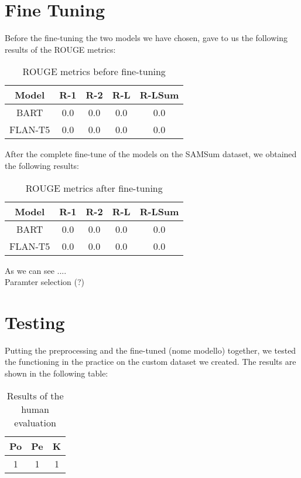 \documentclass[10pt,twocolumn,letterpaper]{article}
\begin{document}
\section{Fine Tuning}
Before the fine-tuning the two models we have chosen, gave to us the following results of the ROUGE metrics:
\begin{table}[h!]
    \centering
    \begin{tabular}{|c|c|c|c|c|}
        \hline
        Model & R-1 & R-2 & R-L & R-LSum \\ 
        \hline
        BART & 0.0 & 0.0 & 0.0 & 0.0\\
        FLAN-T5 & 0.0 & 0.0 & 0.0 & 0.0\\
        \hline
    \end{tabular}
    \caption{ROUGE metrics before fine-tuning}
    \label{table:ROUGEbeforeft}
\end{table}

After the complete fine-tune of the models on the SAMSum dataset, we obtained the following results:
\begin{table}[h!]
    \centering
    \begin{tabular}{|c|c|c|c|c|}
        \hline
        Model & R-1 & R-2 & R-L & R-LSum \\ 
        \hline
        BART & 0.0 & 0.0 & 0.0 & 0.0\\
        FLAN-T5 & 0.0 & 0.0 & 0.0 & 0.0\\
        \hline
    \end{tabular}
    \caption{ROUGE metrics after fine-tuning}
    \label{table:ROUGEafterft}
\end{table}

As we can see .... \\
Paramter selection (?)

\section{Testing}
Putting the preprocessing and the fine-tuned (nome modello) together, we tested the functioning in the practice on the custom dataset we created. The results are shown in the following table:
\begin{table}[h!]
    \centering
    \begin{tabular}{|c|c|c|}
        \hline
        Po & Pe & K \\ 
        \hline
        1 & 1 & 1 \\
        \hline
    \end{tabular}
\caption{Results of the human evaluation}
\label{table:example}
\end{table}
\end{document}
